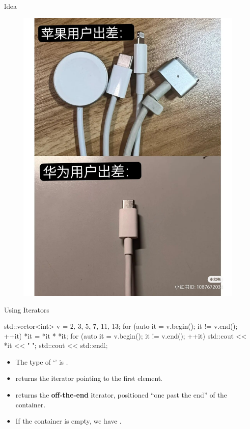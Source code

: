 \begin{frame}{Idea}
\begin{figure}[h]
\begin{minipage}{0.48\textwidth}
            \includegraphics[scale=0.135]{img/interface2.jpg}
        \end{minipage}
    \end{figure}
\end{frame}

\begin{frame}[fragile]{Using Iterators}
    \begin{cpp}
std::vector<int> v = {2, 3, 5, 7, 11, 13};
for (auto it = v.begin(); it != v.end(); ++it)
  *it = *it * *it;
for (auto it = v.begin(); it != v.end(); ++it)
  std::cout << *it << " ";
std::cout << std::endl;
    \end{cpp}
    \begin{itemize}
        \item The type of `' is .
        \item {} returns the iterator pointing to the first element.
        \item {} returns the \textbf{off-the-end} iterator, positioned ``one past the end'' of the container.
        \item If the container is empty, we have .
    \end{itemize}
\end{frame}

